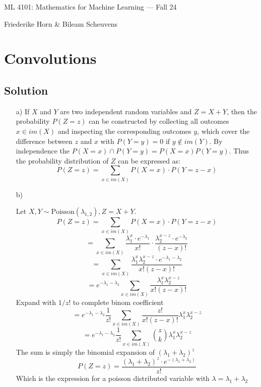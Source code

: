 \documentclass[10pt]{article}
\numberwithin{equation}{section}
\begin{document}
\begin{center}
    \sc ML 4101: Mathematics for Machine Learning --- Fall 24
\end{center}

\noindent Friederike Horn \& Bileam Scheuvens

\section*{Convolutions}

\subsection*{Solution}
\begin{enumerate}
  \item[a)]{
      If $X$ and $Y$ are two independent random variables and $Z = X + Y$, then the probability $P(Z=z)$ can be constructed by collecting all outcomes $x \in im(X)$ and inspecting the corresponding outcomes $y$, which cover the difference between $z$ and $x$ with $P(Y=y) = 0$ if $y\notin im(Y)$. By independence the $P(X=x) \cap P(Y=y) = P(X=x)P(Y=y)$. Thus the probability distribution of $Z$ can be expressed as:
      $$P(Z=z) =\sum_{x\in im(X)} P(X=x) \cdot P(Y=z-x)$$
    }
  \item[b)]{
      Let $X, Y \sim \text{Poisson}(\lambda_{1,2}), Z = X +Y$.
      $$P(Z=z) =\sum_{x\in im(X)} P(X=x) \cdot P(Y=z-x)$$
      $$= \sum_{x\in im(X)} \frac{\lambda_1^x \cdot e^{-\lambda_1}}{x!} \cdot \frac{\lambda_2^{x-z} \cdot e^{-\lambda_2}}{(z-x)!}$$
      $$= \sum_{x\in im(X)} \frac{\lambda_1^x \lambda_2^{x-z} \cdot e^{-\lambda_1 - \lambda_2}}{x! (z-x)!}$$
      $$= e^{-\lambda_1 - \lambda_2} \sum_{x\in im(X)} \frac{\lambda_1^x \lambda_2^{x-z}}{x! (z-x)!} $$
      Expand with $1/z!$ to complete binom coefficient
      $$= e^{-\lambda_1 - \lambda_2} \frac{1}{z!}\sum_{x\in im(X)} \frac{z!}{x! (z-x)!}\lambda_1^x \lambda_2^{x-z} $$
      $$= e^{-\lambda_1 - \lambda_2} \frac{1}{z!}\sum_{x\in im(X)} \binom{z}{k} \lambda_1^x \lambda_2^{x-z} $$
      The sum is simply the binomial expansion of $(\lambda_1 + \lambda_2)^z$
$$P(Z=z) = \frac{(\lambda_1 + \lambda_2)^z \cdot e^{-(\lambda_1 + \lambda_2)}}{z!}$$
Which is the expression for a poisson distributed variable with $\lambda = \lambda_1 + \lambda_2$

}
\end{enumerate}
\end{document}
